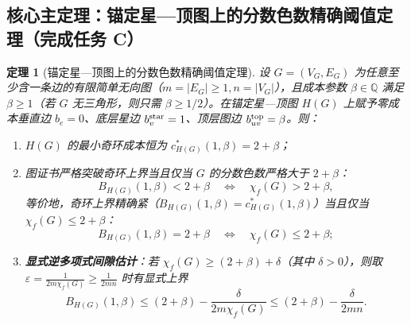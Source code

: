 \documentclass[11pt,a4paper]{ctexart}
\newtheorem{theorem}{定理}[section]
\theoremstyle{definition}
\newcommand{\QQ}{\mathbb Q}
\newcommand{\1}{\boldsymbol 1}
\newcommand{\0}{\boldsymbol 0}
\newcommand{\chif}{\chi_f}
\begin{document}
\subsection{核心主定理：锚定星—顶图上的分数色数精确阈值定理（完成任务 C）}
\begin{theorem}[锚定星—顶图上的分数色数精确阈值定理]\label{thm:main_threshold}
设 $G=(V_G,E_G)$ 为任意至少含一条边的有限简单无向图（$m=|E_G|\ge 1,n=|V_G|$），且成本参数 $\beta\in\QQ$ 满足 $\beta\ge 1$（若 $G$ 无三角形，则只需 $\beta\ge 1/2$）。在锚定星—顶图 $H(G)$ 上赋予零成本垂直边 $b_e=0$、底层星边 $b_v^{\rm star}=1$、顶层图边 $b_{uv}^{\rm top}=\beta$。则：
\begin{enumerate}[label=(\arabic*)]
\item $H(G)$ 的最小奇环成本恒为 $c_{H(G)}^*(1,\beta)=2+\beta$；
\item 图证书严格突破奇环上界当且仅当 $G$ 的分数色数严格大于 $2+\beta$：
\begin{equation}\label{eq:main_iff}
 \boxed{B_{H(G)}(1,\beta) < 2+\beta \quad\Longleftrightarrow\quad \chif(G) > 2+\beta,}
\end{equation}
等价地，奇环上界精确紧（$B_{H(G)}(1,\beta)=c_{H(G)}^*(1,\beta)$）当且仅当 $\chif(G)\le 2+\beta$：
\begin{equation}\label{eq:main_eq}
 \boxed{B_{H(G)}(1,\beta) = 2+\beta \quad\Longleftrightarrow\quad \chif(G) \le 2+\beta;}
\end{equation}
\item \textbf{显式逆多项式间隙估计}：若 $\chif(G)\ge (2+\beta)+\delta$（其中 $\delta>0$），则取 $\varepsilon=\frac{1}{2m\chif(G)}\ge \frac{1}{2mn}$ 时有显式上界
\begin{equation}\label{eq:explicit_gap}
 \boxed{B_{H(G)}(1,\beta) \le (2+\beta) - \frac{\delta}{2m\chif(G)} \le (2+\beta) - \frac{\delta}{2mn}.}
\end{equation}
\end{enumerate}
\end{theorem}
\end{document}
